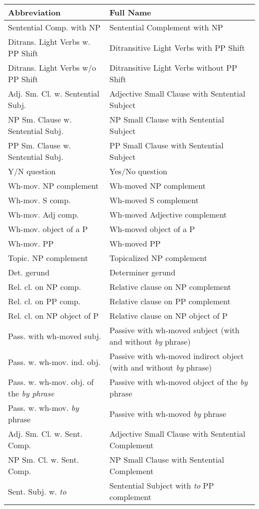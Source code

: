 \small
\begin{tabular}{ll}
Abbreviation&Full Name\\
\hline
Sentential Comp. with NP&Sentential Complement with NP\\
Ditrans. Light Verbs w. PP Shift&Ditransitive Light Verbs with PP Shift\\
Ditrans. Light Verbs w/o PP Shift&Ditransitive Light Verbs without PP Shift\\
Adj. Sm. Cl. w. Sentential Subj.&Adjective Small Clause with Sentential Subject\\
NP Sm. Clause w. Sentential Subj.&NP Small Clause with Sentential Subject\\
PP Sm. Clause w. Sentential Subj.&PP Small Clause with Sentential Subject\\
Y/N question&Yes/No question \\
Wh-mov. NP complement&Wh-moved NP complement \\
Wh-mov. S comp.&Wh-moved S complement \\
Wh-mov. Adj comp.&Wh-moved Adjective complement \\
Wh-mov. object of a P&Wh-moved object of a P \\
Wh-mov. PP&Wh-moved PP \\
Topic. NP complement&Topicalized NP complement \\
Det. gerund&Determiner gerund \\
Rel. cl. on NP comp.&Relative clause on NP complement \\
Rel. cl. on PP comp.& Relative clause on PP complement\\
Rel. cl. on NP object of P& Relative clause on NP object of P\\
Pass. with wh-moved subj.&Passive with wh-moved subject (with and without {\it by} phrase) \\
Pass. w. wh-mov. ind. obj.&Passive with wh-moved indirect object (with and without {\it by} phrase) \\
Pass. w. wh-mov. obj. of the {\it {\it by} phrase}&Passive with wh-moved object of the {\it by} phrase \\
Pass. w. wh-mov. {\it by} phrase&Passive with wh-moved {\it by} phrase \\
Adj. Sm. Cl. w. Sent. Comp.&Adjective Small Clause with Sentential
Complement\\
NP Sm. Cl. w. Sent. Comp.&NP Small Clause with Sentential Complement\\
Sent. Subj. w. {\it to} & Sentential Subject with {\it to} PP complement \\

\end{tabular}
